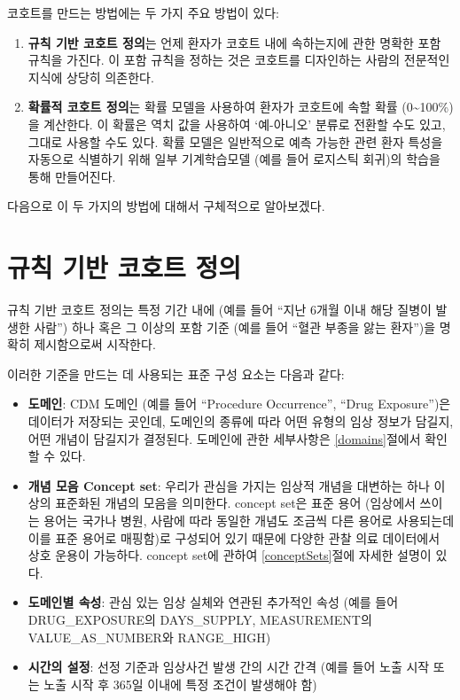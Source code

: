 \documentclass[10.5pt]{book}
\providecommand{\tightlist}{%
  \setlength{\itemsep}{0pt}\setlength{\parskip}{0pt}}
\theoremstyle{definition}
\theoremstyle{definition}
\theoremstyle{definition}
\theoremstyle{remark}
\begin{document}
코호트를 만드는 방법에는 두 가지 주요 방법이 있다:

\begin{enumerate}
\def\labelenumi{\arabic{enumi}.}
\tightlist
\item
  \textbf{규칙 기반 코호트 정의}는 언제 환자가 코호트 내에 속하는지에
  관한 명확한 포함 규칙을 가진다. 이 포함 규칙을 정하는 것은 코호트를
  디자인하는 사람의 전문적인 지식에 상당히 의존한다.
\item
  \textbf{확률적 코호트 정의}는 확률 모델을 사용하여 환자가 코호트에
  속할 확률 (0\textasciitilde{}100\%)을 계산한다. 이 확률은 역치 값을
  사용하여 `예-아니오' 분류로 전환할 수도 있고, 그대로 사용할 수도 있다.
  확률 모델은 일반적으로 예측 가능한 관련 환자 특성을 자동으로 식별하기
  위해 일부 기계학습모델 (예를 들어 로지스틱 회귀)의 학습을 통해
  만들어진다.
\end{enumerate}

다음으로 이 두 가지의 방법에 대해서 구체적으로 알아보겠다.

\section{규칙 기반 코호트 정의}\label{---}

규칙 기반 코호트 정의는 특정 기간 내에 (예를 들어 ``지난 6개월 이내 해당
질병이 발생한 사람'') 하나 혹은 그 이상의 포함 기준 (예를 들어 ``혈관
부종을 앓는 환자'')을 명확히 제시함으로써 시작한다.

이러한 기준을 만드는 데 사용되는 표준 구성 요소는 다음과 같다:

\begin{itemize}
\item
  \textbf{도메인}: CDM 도메인 (예를 들어 ``Procedure Occurrence'',
  ``Drug Exposure'')은 데이터가 저장되는 곳인데, 도메인의 종류에 따라
  어떤 유형의 임상 정보가 담길지, 어떤 개념이 담길지가 결정된다.
  도메인에 관한 세부사항은 \ref{domains}절에서 확인할 수 있다.
\item
  \textbf{개념 모음 Concept set}: 우리가 관심을 가지는 임상적 개념을
  대변하는 하나 이상의 표준화된 개념의 모음을 의미한다. concept set은
  표준 용어 (임상에서 쓰이는 용어는 국가나 병원, 사람에 따라 동일한
  개념도 조금씩 다른 용어로 사용되는데 이를 표준 용어로 매핑함)로
  구성되어 있기 때문에 다양한 관찰 의료 데이터에서 상호 운용이 가능하다.
  concept set에 관하여 \ref{conceptSets}절에 자세한 설명이 있다.
\item
  \textbf{도메인별 속성}: 관심 있는 임상 실체와 연관된 추가적인 속성
  (예를 들어 DRUG\_EXPOSURE의 DAYS\_SUPPLY, MEASUREMENT의
  VALUE\_AS\_NUMBER와 RANGE\_HIGH)
\item
  \textbf{시간의 설정}: 선정 기준과 임상사건 발생 간의 시간 간격 (예를
  들어 노출 시작 또는 노출 시작 후 365일 이내에 특정 조건이 발생해야 함)
\end{itemize}
\end{document}
